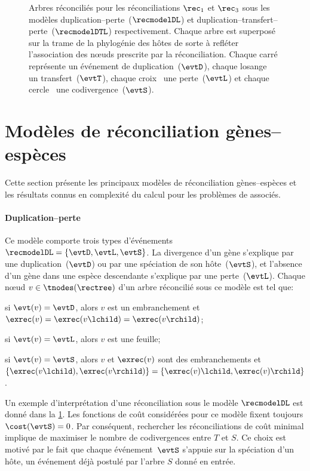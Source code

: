 \begin{figure}[htb]
    \capstart
    \centering
    
    \caption{
        Arbres réconciliés pour les réconciliations \(\rec_1\) et \(\rec_3\) sous les modèles duplication--perte~(\(\recmodelDL\)) et duplication--transfert--perte~(\(\recmodelDTL\)) respectivement.
        Chaque arbre est superposé sur la trame de la phylogénie des hôtes de sorte à refléter l’association des nœuds prescrite par la réconciliation.
        Chaque carré~{\showduplication} représente un événement de duplication~(\(\evtD\)),
        chaque losange~{\showtransfer} un transfert~(\(\evtT\)),
        chaque croix~{\showloss} une perte~(\(\evtL\))
        et chaque cercle~{\showspeciation} une codivergence~(\(\evtS\)).
    }
    \label{figure:rec-trees}
\end{figure}

\section{Modèles de réconciliation gènes--espèces}

Cette section présente les principaux modèles de réconciliation gènes--espèces et les résultats connus en complexité du calcul pour les problèmes de  associés.

\paragraph{Duplication--perte~\textup{\parencite{Goodman1979FittingGeneLineage,Page1994MapsTreesCladistic}}}
Ce modèle comporte trois types d’événements \(\recmodelDL = \{\evtD, \evtL, \evtS\}\).
La divergence d’un gène s’explique par une duplication~(\(\evtD\)) ou par une spéciation de son hôte~(\(\evtS\)), et l’absence d’un gène dans une espèce descendante s’explique par une perte~(\(\evtL\)).
Chaque nœud \(v \in \tnodes(\rectree)\) d’un arbre réconcilié sous ce modèle est tel que:
\begin{compactitemize}
\item si \(\evt(v) = \evtD\), alors \(v\) est un embranchement et \(\exrec(v) = \exrec(v\lchild) = \exrec(v\rchild)\);
    \item si \(\evt(v) = \evtL\), alors \(v\) est une feuille;
    \item si \(\evt(v) = \evtS\), alors \(v\) et \(\exrec(v)\) sont des embranchements et \(\{\exrec(v\lchild), \exrec(v\rchild)\} = \{\exrec(v)\lchild, \exrec(v)\rchild\}\).
\end{compactitemize}
Un exemple d’interprétation d’une réconciliation sous le modèle \(\recmodelDL\) est donné dans la \cref{figure:rec-trees}.
Les fonctions de coût considérées pour ce modèle fixent toujours \(\cost(\evtS) = 0\).
Par conséquent, rechercher les réconciliations de coût minimal implique de maximiser le nombre de codivergences entre \(T\) et \(S\).
Ce choix est motivé par le fait que chaque événement~\(\evtS\) s’appuie sur la spéciation d’un hôte, un événement déjà postulé par l’arbre \(S\) donné en entrée.

